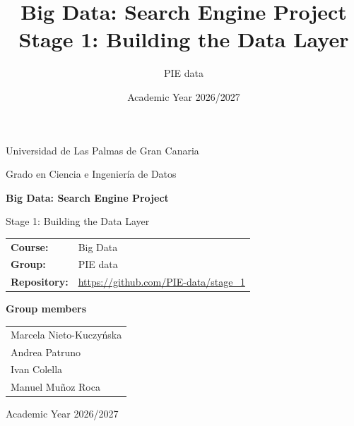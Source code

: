 \documentclass[12pt,a4paper]{article}
\title{Big Data: Search Engine Project\\Stage 1: Building the Data Layer}
\author{PIE data}
\date{Academic Year 2026/2027}
\begin{document}
	
	
	\begin{titlepage}
		\centering
		\vspace*{1.5cm}
		
		{\Large Universidad de Las Palmas de Gran Canaria\par}
		\vspace{0.3cm}
		{\large Grado en Ciencia e Ingeniería de Datos\par}
		
		\vspace{1.5cm}
		
		{\Huge\bfseries Big Data: Search Engine Project\par}
		\vspace{0.45cm}
		{\LARGE Stage 1: Building the Data Layer\par}
		
		\vspace{1.6cm}
		
		\begin{tabular}{ll}
			\textbf{Course:} & Big Data \\
			\textbf{Group:} & PIE data \\
			\textbf{Repository:} & \url{https://github.com/PIE-data/stage_1} \\
		\end{tabular}
		
		\vspace{1.6cm}
		
		{\large\bfseries Group members\par}
		\vspace{0.45cm}
		
		\begin{tabular}{l}
			Marcela Nieto-Kuczyńska \\
			Andrea Patruno \\
			Ivan Colella \\
			Manuel Muñoz Roca \\
		\end{tabular}
		
		\vfill
		{\large Academic Year 2026/2027\par}
	\end{titlepage}
	
	\clearpage
	\tableofcontents
	\clearpage
	
\end{document}
